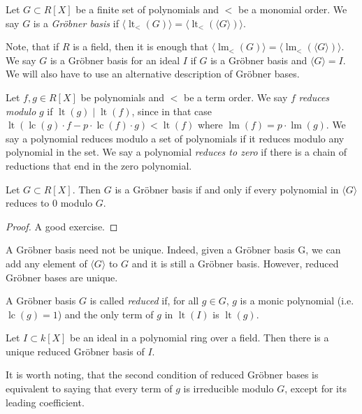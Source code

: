 \documentclass[a4paper, 12pt]{article}
\DeclareMathOperator{\LT}{lt}
\DeclareMathOperator{\LM}{lm}
\DeclareMathOperator{\LC}{lc}
\theoremstyle{changedot}
\theoremstyle{changedotbreak}
\theoremstyle{nonumberplain}
\newtheorem{proof}{Proof}
\begin{document}
\begin{definition}
  Let $G \subset R[X]$ be a finite set of polynomials and $<$ be a monomial order. We say $G$ is a \textit{Gröbner basis} if
  $\langle \LT_{<}(G) \rangle = \langle \LT_{<}(\langle G \rangle ) \rangle $.
\end{definition}

Note, that if $R$ is a field, then it is enough that $\langle \LM_{<}(G) \rangle = \langle \LM_{<}(\langle G \rangle) \rangle$. We say $G$ is a Gröbner basis for an ideal $I$ if $G$ is a Gröbner basis and $\langle G \rangle = I$. We will also have to use an alternative description of Gröbner bases.

\begin{definition}
  Let $f, g \in R[X]$ be polynomials and $<$ be a term order. We say $f$ \textit{reduces modulo} $g$ if $\LT(g) \mid \LT(f)$, since in that case $\LT(\LC(g)\cdot f - p\cdot \LC(f) \cdot g) < \LT(f)$ where $\LM(f) = p \cdot \LM(g)$. We say a polynomial reduces modulo a set of polynomials if it reduces modulo any polynomial in the set. We say a polynomial \textit{reduces to zero} if there is a chain of reductions that end in the zero polynomial.
\end{definition}

\begin{theorem}\label{thm:grb}
  Let $G \subset R[X]$. Then $G$ is a Gröbner basis if and only if every polynomial in $\langle G \rangle$ reduces to 0 modulo $G$.
\end{theorem}
\begin{proof}
  A good exercise.
\end{proof}

A Gröbner basis need not be unique. Indeed, given a Gröbner basis G, we can add any element of $\langle G \rangle$ to $G$ and it is still a Gröbner basis. However, reduced Gröbner bases are unique.

\begin{definition}
  A Gröbner basis $G$ is called \textit{reduced} if, for all $g \in G$, $g$ is a monic polynomial (i.e. $\LC(g) = 1$) and the only term of $g$ in $\LT(I)$ is $\LT(g)$.
\end{definition}
\begin{theorem}
  Let $I \subset k[X]$ be an ideal in a polynomial ring over a field. Then there is a unique reduced Gröbner basis of $I$.
\end{theorem}

It is worth noting, that the second condition of reduced Gröbner bases is equivalent to saying that every term of $g$ is irreducible modulo $G$, except for its leading coefficient.
\end{document}
